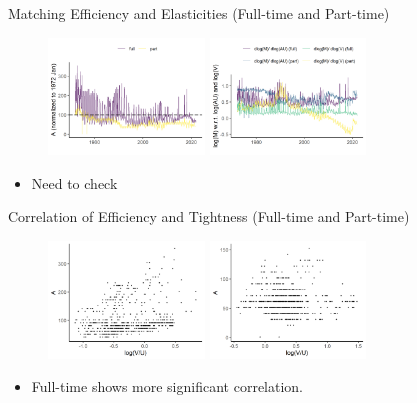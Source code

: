 \documentclass[aspectratio=169]{beamer}
\begin{document}
\begin{frame}{Matching Efficiency and Elasticities (Full-time and Part-time)}
    \begin{figure}[!ht]
  \begin{center}
  \includegraphics[width = 0.37\textwidth]
  {figuretable/matching_efficiency_month_full_time_part_time.png}
  \includegraphics[width = 0.37\textwidth]
  {figuretable/elasticity_month_full_time_part_time.png}
  \end{center}
  \footnotesize
\end{figure} 

\begin{itemize}
    \item Need to check
\end{itemize}
\end{frame}

\begin{frame}{Correlation of Efficiency and Tightness (Full-time and Part-time)}
    
\begin{figure}[!ht]
  \begin{center}
  \includegraphics[width = 0.37\textwidth]
  {figuretable/efficiency_tightness_plot_month_full_time.png}
  \includegraphics[width = 0.37\textwidth]
  {figuretable/efficiency_tightness_plot_month_part_time.png}
  \end{center}
  \footnotesize
\end{figure} 
\begin{itemize}
    \item Full-time shows more significant correlation.
\end{itemize}
\end{frame}
\end{document}
